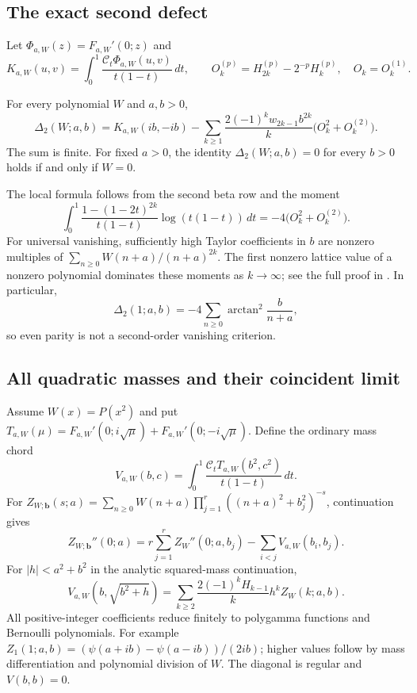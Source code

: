 \subsection{The exact second defect}
Let $\Phi_{a,W}(z)=F_{a,W}'(0;z)$ and
\[
 K_{a,W}(u,v)=\int_0^1\frac{\mathcal C_t\Phi_{a,W}(u,v)}{t(1-t)}\,dt,
 \qquad O_k^{(p)}=H_{2k}^{(p)}-2^{-p}H_k^{(p)},\quad O_k=O_k^{(1)}.
\]
\begin{theorem}\label{hsd:int:second}
For every polynomial $W$ and $a,b>0$,
\[
 \Delta_2(W;a,b)=K_{a,W}(ib,-ib)
 -\sum_{k\ge1}\frac{2(-1)^kw_{2k-1}b^{2k}}k
                          \bigl(O_k^2+O_k^{(2)}\bigr).
\]
The sum is finite. For fixed $a>0$, the identity
$\Delta_2(W;a,b)=0$ for every $b>0$ holds if and only if $W=0$.
\end{theorem}
The local formula follows from the second beta row and the moment
\[
 \int_0^1\frac{1-(1-2t)^{2k}}{t(1-t)}\log(t(1-t))\,dt
                     =-4\bigl(O_k^2+O_k^{(2)}\bigr).
\]
For universal vanishing, sufficiently high Taylor coefficients in $b$
are nonzero multiples of $\sum_{n\ge0}W(n+a)/(n+a)^{2k}$. The first
nonzero lattice value of a nonzero polynomial dominates these moments
as $k\to\infty$; see the full proof in \cite{hsd:continuation}.
In particular,
\[
 \Delta_2(1;a,b)=-4\sum_{n\ge0}\arctan^2\!\frac b{n+a},
\]
so even parity is not a second-order vanishing criterion.

\subsection{All quadratic masses and their coincident limit}
Assume $W(x)=P(x^2)$ and put
$T_{a,W}(\mu)=F_{a,W}'(0;i\sqrt\mu)+F_{a,W}'(0;-i\sqrt\mu)$.
Define the ordinary mass chord
\[
 V_{a,W}(b,c)=\int_0^1\frac{\mathcal C_tT_{a,W}(b^2,c^2)}{t(1-t)}\,dt.
\]
For $Z_{W;\mathbf b}(s;a)=\sum_{n\ge0}W(n+a)
\prod_{j=1}^r((n+a)^2+b_j^2)^{-s}$, continuation gives
\begin{equation}\label{hsd:int:masses}
 Z_{W;\mathbf b}''(0;a)=r\sum_{j=1}^r Z_W''(0;a,b_j)
                         -\sum_{i<j}V_{a,W}(b_i,b_j).
\end{equation}
For $|h|<a^2+b^2$ in the analytic squared-mass continuation,
\begin{equation}\label{hsd:int:confluence}
 V_{a,W}(b,\sqrt{b^2+h})=
 \sum_{k\ge2}\frac{2(-1)^kH_{k-1}}k h^kZ_W(k;a,b).
\end{equation}
All positive-integer coefficients reduce finitely to polygamma functions
and Bernoulli polynomials. For example
$Z_1(1;a,b)=(\psi(a+ib)-\psi(a-ib))/(2ib)$; higher values follow by
mass differentiation and polynomial division of $W$.
The diagonal is regular and $V(b,b)=0$.

